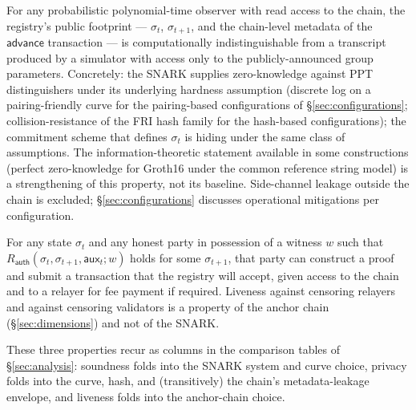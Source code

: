 \begin{property}
For any probabilistic polynomial-time observer with read access to
the chain, the registry's public footprint --- $\sigma_t$,
$\sigma_{t+1}$, and the chain-level metadata of the $\mathsf{advance}$
transaction --- is computationally indistinguishable from a transcript
produced by a simulator with access only to the publicly-announced
group parameters. Concretely: the SNARK supplies zero-knowledge
against PPT distinguishers under its underlying hardness assumption
(discrete log on a pairing-friendly curve for the pairing-based
configurations of \S\ref{sec:configurations}; collision-resistance
of the FRI hash family for the hash-based configurations); the
commitment scheme that defines $\sigma_t$ is hiding under the same
class of assumptions. The information-theoretic statement available
in some constructions (perfect zero-knowledge for Groth16 under the
common reference string model) is a strengthening of this property,
not its baseline. Side-channel leakage outside the chain is
excluded; \S\ref{sec:configurations} discusses operational
mitigations per configuration.
\end{property}

\begin{property}[Liveness]
For any state $\sigma_t$ and any honest party in possession of a
witness $w$ such that $R_{\mathsf{auth}}(\sigma_t, \sigma_{t+1},
\mathsf{aux}_t; w)$ holds for some $\sigma_{t+1}$, that party can
construct a proof and submit a transaction that the registry will
accept, given access to the chain and to a relayer for fee payment if
required. Liveness against censoring relayers and against censoring
validators is a property of the anchor chain (\S\ref{sec:dimensions})
and not of the SNARK.
\end{property}

These three properties recur as columns in the comparison tables of
\S\ref{sec:analysis}: soundness folds into the SNARK system and curve
choice, privacy folds into the curve, hash, and (transitively) the
chain's metadata-leakage envelope, and liveness folds into the
anchor-chain choice.
